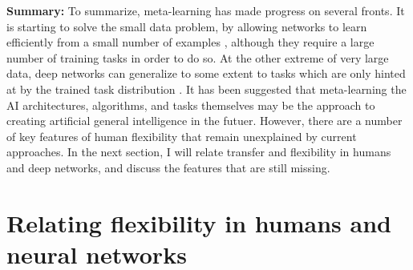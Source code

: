 \textbf{Summary:} To summarize, meta-learning has made progress on several fronts. It is starting to solve the small data problem, by allowing networks to learn efficiently from a small number of examples \citep[e.g.][]{Wang2016a}, although they require a large number of training tasks in order to do so. At the other extreme of very large data, deep networks can generalize to some extent to tasks which are only hinted at by the trained task distribution \citep[e.g.][]{Radford2019}. It has been suggested that meta-learning the AI architectures, algorithms, and tasks themselves may be the approach to creating artificial general intelligence in the futuer. However, there are a number of key features of human flexibility that remain unexplained by current approaches. In the next section, I will relate transfer and flexibility in humans and deep networks, and discuss the features that are still missing. \par 

\section{Relating flexibility in humans and neural networks}

